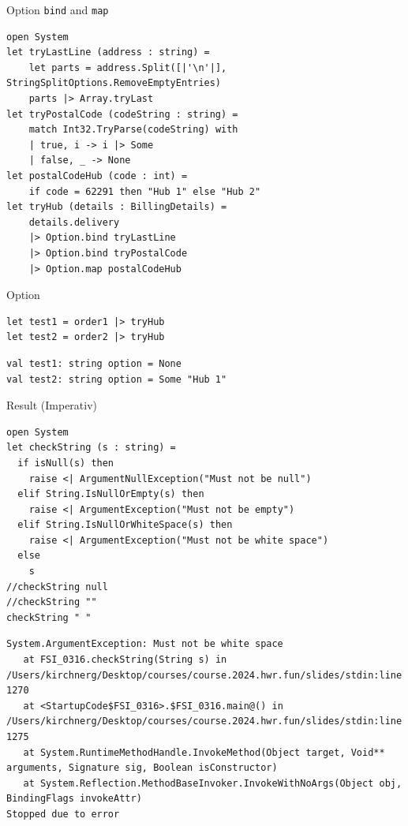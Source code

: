 \documentclass[t]{beamer}
\begin{document}
\begin{frame}[label={sec:orged8f3b7},fragile]{Option \texttt{bind} and \texttt{map}}
 \begin{verbatim}
open System
let tryLastLine (address : string) = 
    let parts = address.Split([|'\n'|], StringSplitOptions.RemoveEmptyEntries)
    parts |> Array.tryLast
let tryPostalCode (codeString : string) = 
    match Int32.TryParse(codeString) with 
    | true, i -> i |> Some
    | false, _ -> None
let postalCodeHub (code : int) = 
    if code = 62291 then "Hub 1" else "Hub 2"
let tryHub (details : BillingDetails) = 
    details.delivery
    |> Option.bind tryLastLine 
    |> Option.bind tryPostalCode 
    |> Option.map postalCodeHub
\end{verbatim}
\end{frame}

\begin{frame}[label={sec:orgb128144},fragile]{Option}
 \begin{verbatim}
let test1 = order1 |> tryHub
let test2 = order2 |> tryHub
\end{verbatim}

\begin{verbatim}
val test1: string option = None
val test2: string option = Some "Hub 1"
\end{verbatim}
\end{frame}

\begin{frame}[label={sec:org146bc7f},fragile]{Result (Imperativ)}
 \begin{verbatim}
open System
let checkString (s : string) =
  if isNull(s) then
    raise <| ArgumentNullException("Must not be null")
  elif String.IsNullOrEmpty(s) then
    raise <| ArgumentException("Must not be empty")
  elif String.IsNullOrWhiteSpace(s) then
    raise <| ArgumentException("Must not be white space")
  else
    s
//checkString null
//checkString ""
checkString " "
\end{verbatim}

\begin{verbatim}
System.ArgumentException: Must not be white space
   at FSI_0316.checkString(String s) in /Users/kirchnerg/Desktop/courses/course.2024.hwr.fun/slides/stdin:line 1270
   at <StartupCode$FSI_0316>.$FSI_0316.main@() in /Users/kirchnerg/Desktop/courses/course.2024.hwr.fun/slides/stdin:line 1275
   at System.RuntimeMethodHandle.InvokeMethod(Object target, Void** arguments, Signature sig, Boolean isConstructor)
   at System.Reflection.MethodBaseInvoker.InvokeWithNoArgs(Object obj, BindingFlags invokeAttr)
Stopped due to error
\end{verbatim}
\end{frame}
\end{document}
